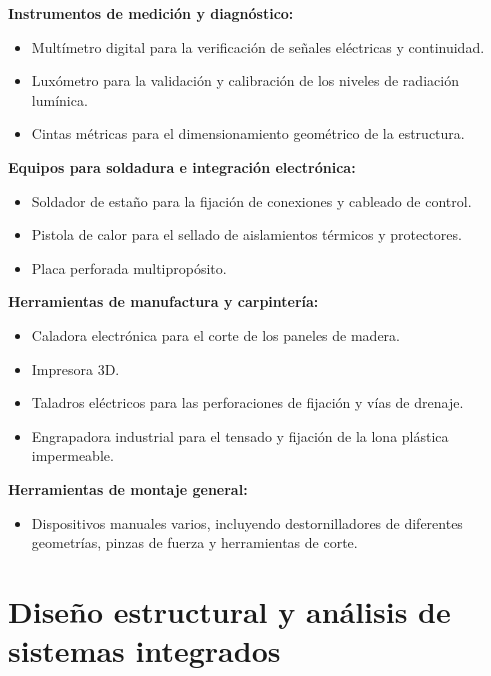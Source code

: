 \textbf{Instrumentos de medición y diagnóstico:}
\begin{itemize}
    \item Multímetro digital para la verificación de señales eléctricas y continuidad.
    \item Luxómetro para la validación y calibración de los niveles de radiación lumínica.
    \item Cintas métricas para el dimensionamiento geométrico de la estructura.
\end{itemize}

\textbf{Equipos para soldadura e integración electrónica:}
\begin{itemize}
    \item Soldador de estaño para la fijación de conexiones y cableado de control.
    \item Pistola de calor para el sellado de aislamientos térmicos y protectores.
    \item Placa perforada multipropósito.
\end{itemize}

\textbf{Herramientas de manufactura y carpintería:}
\begin{itemize}
    \item Caladora electrónica para el corte de los paneles de madera.
    \item Impresora 3D.
    \item Taladros eléctricos para las perforaciones de fijación y vías de drenaje.
    \item Engrapadora industrial para el tensado y fijación de la lona plástica impermeable.
\end{itemize}

\textbf{Herramientas de montaje general:}
\begin{itemize}
    \item Dispositivos manuales varios, incluyendo destornilladores de diferentes geometrías, pinzas de fuerza y herramientas de corte.
\end{itemize}

\chapter{Diseño estructural y análisis de sistemas integrados}
\label{cha:diseno_estructural}

